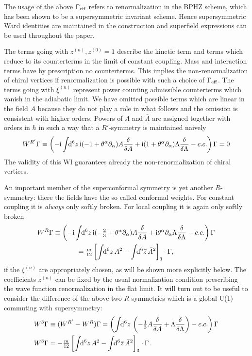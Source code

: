 \documentclass[a4paper,12pt]{article}
\newcommand{\I}{{\rm i}}
\def\pr{\partial}
\newcommand{\dS}{\!\!{\rm d}^6z\,}
\newcommand{\dSb}{\!\!{\rm d}^6\bar z\,}
\newcommand{\Geff}{\Gamma_{\rm eff}}
\newcommand{\al}{\alpha}
\newcommand{\tfr}[2]{{\textstyle \frac{#1}{#2}}}
\newcommand{\fdq}[2]{\frac{\delta #1}{\delta #2}}
\begin{document}
The usage of the above $\Geff$ refers to renormalization
in the BPHZ scheme, which has been shown to be a
supersymmetric invariant scheme. Hence supersymmetric Ward identities
are maintained in the construction and superfield expressions can be
used throughout the paper.
 
The terms going with $z^{(n)}, z^{(0)} = 1$ describe the kinetic term
and terms which reduce to its counterterms in the limit of constant 
coupling. Mass and interaction terms have by prescription no
counterterms. This implies 
the non-renormalization of chiral vertices if renormalization is possible 
with such a choice of $\Geff$. The terms going with $\xi^{(n)}$ represent
power counting admissible counterterms which vanish in the adiabatic limit.
We have omitted possible terms which are linear in the field $A$ because
they do not play a role in what follows and the omission is consistent
with higher orders. 
Powers  of $\Lambda$ and $\bar\Lambda$ are assigned together with orders in
$\hbar$ in such a way that a $R'$-symmetry \cite{SEI93,FK} is maintained
naively
\begin{equation}
W^{R'} \Gamma \equiv \left( -\I \int \dS \I( -1+\theta^\al\pr_\al) A \fdq{}{A}
+ \I( 1+\theta^\al\pr_\al) \Lambda
\fdq{}{\Lambda} - c.c. \right) \Gamma =0
\end{equation}
The validity of this WI guarantees already the non-renormalization of
chiral vertices.

An important member of the superconformal symmetry is yet another
$R$-symmetry:  there the fields have the so called conformal weights.
For constant coupling it is {\sl always} only softly broken. For local
coupling it is again only softly broken 
\begin{multline}
W^{R} \Gamma \equiv \left( -\I \int \dS \I( -\tfr{2}{3}+\theta^\al\pr_\al)
  A \fdq{}{A} + \I\theta^\al\pr_\al \Lambda \fdq{}{\Lambda} - c.c. \right)
  \Gamma \\
= \tfr{m}{12} \left[ \int \dS A^2 - \int \dSb \bar A^2 \right]_3 \cdot
  \Gamma,
\label{RWI}
\end{multline}
if the $\xi^{(n)}$ are appropriately chosen, as will be shown more explicitly
below.  The coefficients $z^{(n)}$ can be fixed by the usual normalization
condition prescribing the wave function renormalization in the flat limit.
It will turn out to be useful to consider the difference of the above two
$R$-symmetries which is a global U(1) commuting with supersymmetry:
 \begin{align}
W^3 \Gamma &\equiv (W^{R'}-W^{R})\Gamma  = \left( \int \dS \left(-\tfr{1}{3} A
  \fdq{}{A} + \Lambda \fdq{}{\Lambda}\right) -c.c. \right) \Gamma \label{W3def}\\
W^3\Gamma &= -\tfr{m}{12} \left[ \int \dS A^2 - \int \dSb \bar A^2
  \right]_3 \cdot \Gamma\,.
\end{align}
\end{document}
